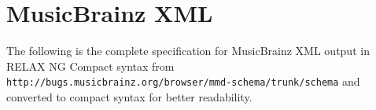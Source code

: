 
\section{MusicBrainz XML}

The following is the complete specification for MusicBrainz XML output
in RELAX NG Compact syntax from
\texttt{http://bugs.musicbrainz.org/browser/mmd-schema/trunk/schema}
and converted to compact syntax for better readability.

